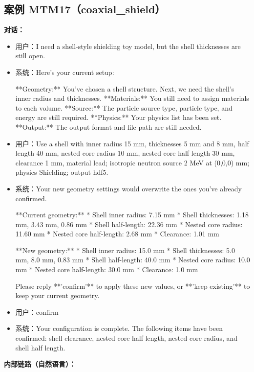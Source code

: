 \documentclass[11pt]{ctexart}
\begin{document}
\subsection{案例 MTM17（coaxial\_shield）}
\textbf{对话：}
\begin{itemize}
\item 用户：I need a shell-style shielding toy model, but the shell thicknesses are still open.
\item 系统：Here's your current setup:

**Geometry:** You've chosen a shell structure. Next, we need the shell's inner radius and thicknesses.
**Materials:** You still need to assign materials to each volume.
**Source:** The particle source type, particle type, and energy are still required.
**Physics:** Your physics list has been set.
**Output:** The output format and file path are still needed.
\item 用户：Use a shell with inner radius 15 mm, thicknesses 5 mm and 8 mm, half length 40 mm, nested core radius 10 mm, nested core half length 30 mm, clearance 1 mm, material lead; isotropic neutron source 2 MeV at (0,0,0) mm; physics Shielding; output hdf5.
\item 系统：Your new geometry settings would overwrite the ones you've already confirmed.

**Current geometry:**
*   Shell inner radius: 7.15 mm
*   Shell thicknesses: 1.18 mm, 3.43 mm, 0.86 mm
*   Shell half-length: 22.36 mm
*   Nested core radius: 11.60 mm
*   Nested core half-length: 2.68 mm
*   Clearance: 1.01 mm

**New geometry:**
*   Shell inner radius: 15.0 mm
*   Shell thicknesses: 5.0 mm, 8.0 mm, 0.83 mm
*   Shell half-length: 40.0 mm
*   Nested core radius: 10.0 mm
*   Nested core half-length: 30.0 mm
*   Clearance: 1.0 mm

Please reply **'confirm'** to apply these new values, or **'keep existing'** to keep your current geometry.
\item 用户：confirm
\item 系统：Your configuration is complete. The following items have been confirmed: shell clearance, nested core half length, nested core radius, and shell half length.
\end{itemize}
\textbf{内部链路（自然语言）：}
\end{document}

